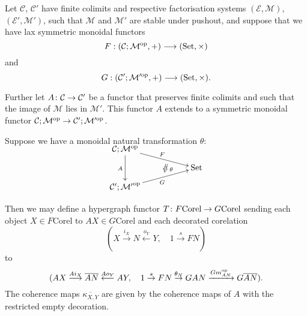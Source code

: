 \begin{proposition}\label{prop.deccorelfunctors}
  Let $\mathcal C$, $\mathcal C'$ have finite colimits and respective
factorisation systems $(\mathcal E, \mathcal M)$, $(\mathcal E', \mathcal M')$,
such that $\mathcal M$ and $\mathcal M'$ are stable under pushout, and suppose
that we have lax symmetric monoidal functors
\[
  F: (\mathcal C;\mathcal M^{\mathrm{op}},+) \longrightarrow (\mathrm{Set}, \times)
\]
and
\[
  G: (\mathcal C';\mathcal M'^{\mathrm{op}},+) \longrightarrow (\mathrm{Set}, \times).
\]

Further let $A{\colon} \mathcal C \to \mathcal C'$ be a functor that preserves
finite colimits and such that the image of $\mathcal M$ lies in $\mathcal M'$.
This functor $A$ extends to a symmetric monoidal functor $\mathcal C;\mathcal M^{\mathrm{op}} \to
\mathcal C';\mathcal M'^{\mathrm{op}}$.

Suppose we have a monoidal natural transformation $\theta$:
\[
  \xymatrixrowsep{2ex}
  \xymatrix{
    \mc C; \mc M^\opp \ar[dd]_{A} \ar[drr]^F  \\
    &\twocell \omit{_\:\theta}& \Set \\
    \mc C'; \mc {M'}^\opp \ar[urr]_{G} 
  }
\]

Then we may define a hypergraph functor $T{\colon} F\mathrm{Corel} \to
G\mathrm{Corel}$ sending each object $X \in F\mathrm{Corel}$ to $AX \in
G\mathrm{Corel}$ and each decorated corelation 
\[
  (X \stackrel{i_X}{\longrightarrow} N \stackrel{o_Y}{\longleftarrow} Y, \quad
  1 \stackrel{s}{\to} FN)
\]
to
\[
  (AX \stackrel{Ai_X}{\longrightarrow} \overline{AN} \stackrel{Ao_Y}{\longleftarrow} AY,
  \quad 1 \stackrel{s}{\to} FN \stackrel{\theta_N}{\to} GAN
  \xrightarrow{Gm_{AN}^{\mathrm{op}}} G\overline{AN}).
\]
The coherence maps $\overline{\kappa_{X,Y}}$ are given by the coherence maps of $A$ with the restricted empty decoration.
\end{proposition}
